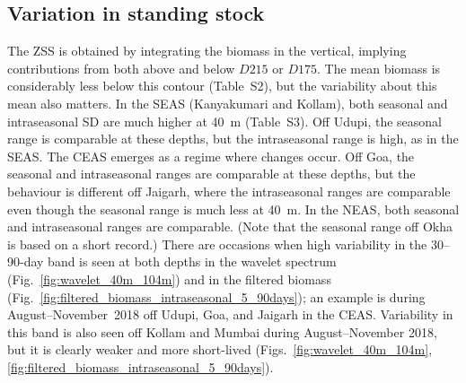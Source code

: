 \documentclass[authoryear,review,11pt]{elsarticle}
\begin{document}

%
%
%
%

\subsection{Variation in standing stock}
\label{sec:intraseasonal.ss}

The ZSS is obtained by integrating the biomass in the vertical, implying contributions from both above and below $D215$ or $D175$.  The mean biomass is considerably less below this contour (Table~S2), but the variability about this mean also matters. In the SEAS (Kanyakumari and Kollam), both seasonal and intraseasonal SD are much higher at 40~m (Table~S3). Off Udupi, the seasonal range is comparable at these depths, but the intraseasonal range is high, as in the SEAS.  The CEAS emerges as a regime where changes occur.  Off Goa, the seasonal and intraseasonal ranges are comparable at these depths, but the behaviour is different off Jaigarh, where the intraseasonal ranges are comparable even though the seasonal range is much less at 40~m. In the NEAS, both seasonal and intraseasonal ranges are comparable.  (Note that the seasonal range off Okha is based on a short record.)  There are occasions when high variability in the 30--90-day band is seen at both depths in the wavelet spectrum (Fig.~\ref{fig:wavelet_40m_104m}) and in the filtered biomass (Fig.~\ref{fig:filtered_biomass_intraseasonal_5_90days}); an example is during August--November~2018 off Udupi, Goa, and Jaigarh in the CEAS. Variability in this band is also seen off Kollam and Mumbai during  August--November 2018, but it is clearly weaker and more short-lived (Figs.~\ref{fig:wavelet_40m_104m},\ref{fig:filtered_biomass_intraseasonal_5_90days}).
\end{document}
